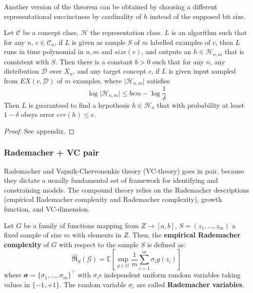 \documentclass[10pt]{article}
\begin{document}
Another version of the theorem can be obtained by choosing a different representational succinctness by cardinality of $h$ instead of the supposed bit size. 

\begin{theorem}
    Let $\mathcal{C}$ be a concept class, $\mathcal{H}$ the representation class. $L$ is an algorithm such that for any $n$, $c\in\mathcal{C}_{n}$, if $L$ is given as sample $S$ of $m$ labelled examples of $c$, then $L$ runs in time polynomial in $n,m$ and $size(c)$, and outputs an $h\in\mathcal{H}_{n,m}$ that is consistent with $S$. Then there is a constant $b>0$ such that for any $n$, any distribution $\mathcal{D}$ over $X_{n}$, and any target concept $c$, if $L$ is given input sampled from $EX(c,\mathcal{D})$ of $m$ examples, where $\lvert \mathcal{H}_{n,m}\rvert$ satisfies 
    \begin{equation}
        \log{\lvert \mathcal{H}_{n,m}\rvert} \leq b\epsilon m - \log{\frac{1}{\delta}}
    \end{equation}
    Then $L$ is guaranteed to find a hypothesis $h\in \mathcal{H}_{n}$ that with probability at least $1-\delta$ obeys error $err(h)\leq \epsilon$. 
\end{theorem}
\begin{proof}
    See appendix.
\end{proof}

\subsubsection{Rademacher + VC pair}

Rademacher and Vapnik-Chervonenkis theory (VC-theory) goes in pair, because they dictate a usually fundamental set of framework for identifying and constraining models. The compound theory relies on the Rademacher descriptions (empirical Rademacher complexity and Rademacher complexity), growth function, and VC-dimension. \cite{10.5555/2371238,STL_Hajek_Maxim_2021,10.5555/2930837}

Let $G$ be a family of functions mapping from $Z\to [a,b]$, $S=(z_1,\dots, z_m)$ a fixed sample of size $m$ with elements in $Z$. Then, the \textbf{empirical Rademacher complexity} of $G$ with respect to the sample $S$ is defined as:
\begin{equation*}
    \hat{\mathfrak{R}}_S (\mathcal{G}) = \mathbb{E} \left[ \sup_{g\in G} \frac{1}{m} \sum^{m}_{i=1} \sigma_i g(z_i) \right]
\end{equation*}
where $\bm{\sigma}=\{\sigma_1,\dots,\sigma_m\}^{\top}$ with $\sigma_i$s independent uniform random variables taking values in $\{-1,+1\}$. The random variable $\sigma_i$ are called \textbf{Rademacher variables}.
\end{document}
